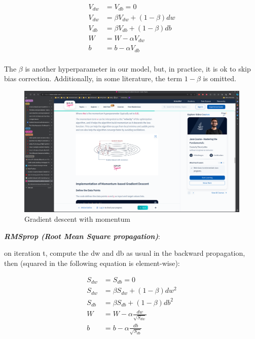 \documentclass[12pt]{report}
\begin{document}
\begin{align}
  V_{dw} &= V_{db} = 0 \\
  V_{dw} &= \beta V_{dw} + (1-\beta) dw \\
  V_{db} &=  \beta V_{db} + (1-\beta) db \\
  W &= W- \alpha V_{dw} \\
  b &= b- \alpha V_{db} \\
\end{align}

The $\beta$ is another hyperparameter in our model, but, in practice, it is ok to skip bias correction. Additionally, in some literature, the term $1-\beta$ is omitted.

\begin{figure}[htbp]
  \begin{center}
    \includegraphics[trim =25cm 22.0cm 40cm 20.0cm, clip, scale=0.4]{pics/GD_with_momentum.png}
    \caption{Gradient descent with momentum}
  \end{center}
\end{figure}


\textbf{\textit{RMSprop (Root Mean Square propagation)}}:

on iteration t, compute the dw and db as usual in the backward propagation, then (squared in the following equation is element-wise):

\begin{align}
  S_{dw} &= S_{db} = 0 \\
  S_{dw} &= \beta S_{dw} + (1-\beta) dw^2\\
  S_{db} &= \beta S_{db} + (1-\beta) db^2\\
  W &= W- \alpha \frac{dw}{\sqrt{S_{dw}}} \\
  b &= b- \alpha \frac{db}{\sqrt{S_{db}}} \\
\end{align}
\end{document}
